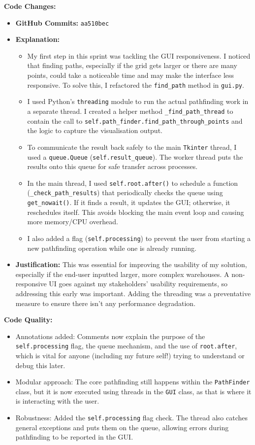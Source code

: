 \textbf{Code Changes:}
\begin{itemize}
	\item \textbf{GitHub Commits:} \verb|aa510bec|
	\item \textbf{Explanation:}
	\begin{itemize}
		\item My first step in this sprint was tackling the GUI responsiveness. I noticed that finding paths, especially if the grid gets larger or there are many points, could take a noticeable time and may make the interface less responsive. To solve this, I refactored the \verb|find_path| method in \verb|gui.py|.
		\item I used Python's \verb|threading| module to run the actual pathfinding work in a separate thread. I created a helper method \verb|_find_path_thread| to contain the call to \verb|self.path_finder.find_path_through_points| and the logic to capture the visualisation output.
		\item To communicate the result back safely to the main \verb|Tkinter| thread, I used a \verb|queue.Queue| (\verb|self.result_queue|). The worker thread puts the results onto this queue for safe transfer across processes.
		\item In the main thread, I used \verb|self.root.after()| to schedule a function (\verb|_check_path_results|) that periodically checks the queue using \verb|get_nowait()|. If it finds a result, it updates the GUI; otherwise, it reschedules itself. This avoids blocking the main event loop and causing more memory/CPU overhead.
		\item I also added a flag (\verb|self.processing|) to prevent the user from starting a new pathfinding operation while one is already running.

	\end{itemize}
	\item \textbf{Justification:} This was essential for improving the usability of my solution, especially if the end-user inputted larger, more complex warehouses. A non-responsive UI goes against my stakeholders' usability requirements, so addressing this early was important. Adding the threading was a preventative measure to ensure there isn't any performance degradation.
\end{itemize}

\textbf{Code Quality:}
\begin{itemize}
	\item Annotations added: Comments now explain the purpose of the \verb|self.processing| flag, the queue mechanism, and the use of \verb|root.after|, which is vital for anyone (including my future self!) trying to understand or debug this later.
	\item Modular approach: The core pathfinding still happens within the \verb|PathFinder| class, but it is now executed using threads in the \verb|GUI| class, as that is where it is interacting with the user.
	\item Robustness: Added the \verb|self.processing| flag check. The thread also catches general exceptions and puts them on the queue, allowing errors during pathfinding to be reported in the GUI.
\end{itemize}

